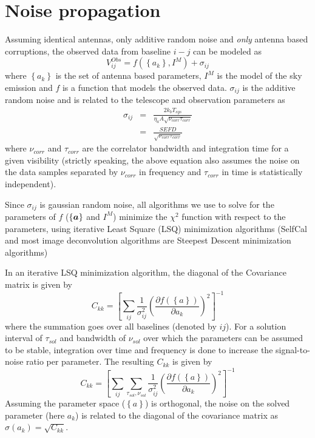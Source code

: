 \documentclass[11pt]{article}
\def\vec#1{\ensuremath{\mathchoice{\mbox{\boldmath$\displaystyle#1$}}
{\mbox{\boldmath$\textstyle#1$}}
{\mbox{\boldmath$\scriptstyle#1$}}
{\mbox{\boldmath$\scriptscriptstyle#1$}}}}
\begin{document}
\section{Noise propagation}

Assuming identical antennas, only additive random noise and {\it only}
antenna based corruptions, the observed data from
baseline $i-j$ can be modeled as
\begin{equation}
V^{Obs}_{ij} = f(\left\{a_k\right\}, I^M) + \sigma_{ij}
\end{equation}
where $\left\{a_k\right\}$ is the set of antenna based parameters, $I^M$ is the
model of the sky emission and $f$ is a function that models the
observed data.  $\sigma_{ij}$ is the additive random noise
and is related to the telescope and observation parameters as
\begin{eqnarray}
\sigma_{ij} &=& \frac{2 k_b T_{sys}}{\eta_a A \sqrt{\nu_{corr} \tau_{corr}}}\\
&=& \frac{SEFD}{\sqrt{\nu_{corr} \tau_{corr}}}
\end{eqnarray}
where $\nu_{corr}$ and $\tau_{corr}$ are the correlator
bandwidth and integration time for a given visibility (strictly speaking, the above equation
also assumes the noise on the data samples separated by
$\nu_{corr}$ in frequency and $\tau_{corr}$ in time is
statistically independent).

Since $\sigma_{ij}$ is gaussian random noise, all algorithms we use to
solve for the parameters of $f$ ($\{\vec{a}\}$ and $I^M$) minimize the
$\chi^2$ function with respect to the parameters, using iterative
Least Square (LSQ) minimization algorithms (SelfCal and most image
deconvolution algorithms are Steepest Descent minimization algorithms)

In an iterative LSQ minimization algorithm, the diagonal of the
Covariance matrix is given by
\begin{equation}
 C_{kk} = \left[ \sum_{ij}\frac{1}{\sigma_{ij}^2} 
   \left(
     \frac{\partial f(\left\{ a \right\})}{\partial a_k} \right)^2\right]^{-1}
\end{equation}
where the summation goes over all baselines (denoted by $ij$).  For a
solution interval of $\tau_{sol}$ and bandwidth of $\nu_{sol}$ over
which the parameters can be assumed to be stable, integration over
time and frequency is done to increase the signal-to-noise ratio per
parameter.  The resulting $C_{kk}$ is given by
\begin{equation}
\label{CKKAvg}
 C_{kk} = \left[ \sum_{ij}\sum_{\tau_{sol},\nu_{sol}}\frac{1}{\sigma_{ij}^2} 
   \left(
     \frac{\partial f(\left\{ a \right\})}{\partial a_k} \right)^2\right]^{-1}
\end{equation}
Assuming the parameter space ($\left\{ a \right\}$) is orthogonal, the
noise on the solved parameter (here $a_k$) is related to the diagonal
of the covariance matrix as $\sigma(a_k) = \sqrt{C_{kk}}$.
\end{document}
